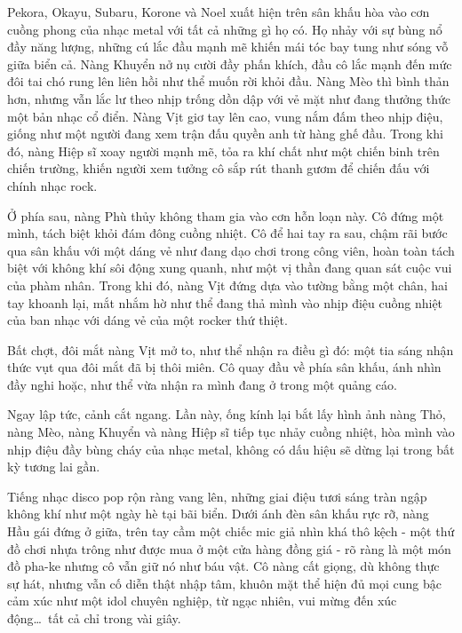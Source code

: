 \documentclass[../main.tex]{subfiles}
\begin{document}
Pekora, Okayu, Subaru, Korone và Noel xuất hiện trên sân khấu hòa vào cơn cuồng phong của nhạc metal với tất cả những gì họ có. Họ nhảy với sự bùng nổ đầy năng lượng, những cú lắc đầu mạnh mẽ khiến mái tóc bay tung như sóng vỗ giữa biển cả. Nàng Khuyển nở nụ cười đầy phấn khích, đầu cô lắc mạnh đến mức đôi tai chó rung lên liên hồi như thể muốn rời khỏi đầu. Nàng Mèo thì bình thản hơn, nhưng vẫn lắc lư theo nhịp trống dồn dập với vẻ mặt như đang thưởng thức một bản nhạc cổ điển. Nàng Vịt giơ tay lên cao, vung nắm đấm theo nhịp điệu, giống như một người đang xem trận đấu quyền anh từ hàng ghế đầu. Trong khi đó, nàng Hiệp sĩ xoay người mạnh mẽ, tỏa ra khí chất như một chiến binh trên chiến trường, khiến người xem tưởng cô sắp rút thanh gươm để chiến đấu với chính nhạc rock.

Ở phía sau, nàng Phù thủy không tham gia vào cơn hỗn loạn này. Cô đứng một mình, tách biệt khỏi đám đông cuồng nhiệt. Cô để hai tay ra sau, chậm rãi bước qua sân khấu với một dáng vẻ như đang dạo chơi trong công viên, hoàn toàn tách biệt với không khí sôi động xung quanh, như một vị thần đang quan sát cuộc vui của phàm nhân. Trong khi đó, nàng Vịt đứng dựa vào tường bằng một chân, hai tay khoanh lại, mắt nhắm hờ như thể đang thả mình vào nhịp điệu cuồng nhiệt của ban nhạc với dáng vẻ của một rocker thứ thiệt.

Bất chợt, đôi mắt nàng Vịt mở to, như thể nhận ra điều gì đó: một tia sáng nhận thức vụt qua đôi mắt đã bị thôi miên. Cô quay đầu về phía sân khấu, ánh nhìn đầy nghi hoặc, như thể vừa nhận ra mình đang ở trong một quảng cáo.

Ngay lập tức, cảnh cắt ngang. Lần này, ống kính lại bắt lấy hình ảnh nàng Thỏ, nàng Mèo, nàng Khuyển và nàng Hiệp sĩ tiếp tục nhảy cuồng nhiệt, hòa mình vào nhịp điệu đầy bùng cháy của nhạc metal, không có dấu hiệu sẽ dừng lại trong bất kỳ tương lai gần.

\ct


Tiếng nhạc disco pop rộn ràng vang lên, những giai điệu tươi sáng tràn ngập không khí như một ngày hè tại bãi biển. Dưới ánh đèn sân khấu rực rỡ, nàng Hầu gái đứng ở giữa, trên tay cầm một chiếc mic giả nhìn khá thô kệch - một thứ đồ chơi nhựa trông như được mua ở một cửa hàng đồng giá - rõ ràng là một món đồ pha-ke nhưng cô vẫn giữ nó như báu vật. Cô nàng cất giọng, dù không thực sự hát, nhưng vẫn cố diễn thật nhập tâm, khuôn mặt thể hiện đủ mọi cung bậc cảm xúc như một idol chuyên nghiệp, từ ngạc nhiên, vui mừng đến xúc động\dots\ tất cả chỉ trong vài giây.
\end{document}
